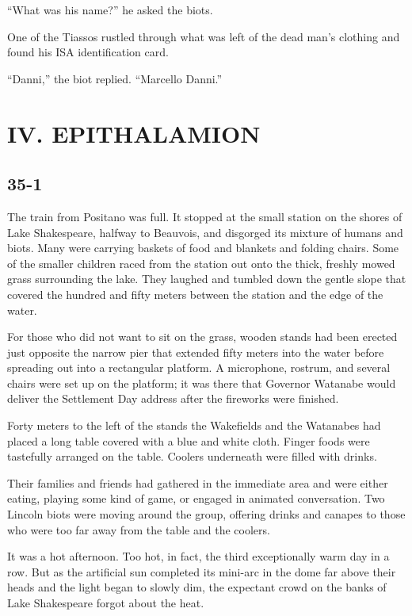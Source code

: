 \documentclass[]{article}
\begin{document}
{“What was his name?” he asked the biots.

One of the Tiassos rustled through what was left of the dead man’s clothing and found his ISA identification card.

“Danni,” the biot replied. “Marcello Danni.”


\section{IV. EPITHALAMION}



\subsection{35-1}

The train from Positano was full. It stopped at the small station on the shores of Lake Shakespeare, halfway to Beauvois, and disgorged its mixture of humans and biots. Many were carrying baskets of food and blankets and folding chairs. Some of the smaller children raced from the station out onto the thick, freshly mowed grass surrounding the lake. They laughed and tumbled down the gentle slope that covered the hundred and fifty meters between the station and the edge of the water.

For those who did not want to sit on the grass, wooden stands had been erected just opposite the narrow pier that extended fifty meters into the water before spreading out into a rectangular platform. A microphone, rostrum, and several chairs were set up on the platform; it was there that Governor Watanabe would deliver the Settlement Day address after the fireworks were finished.

Forty meters to the left of the stands the Wakefields and the Watanabes had placed a long table covered with a blue and white cloth. Finger foods were tastefully arranged on the table. Coolers underneath were filled with drinks.

Their families and friends had gathered in the immediate area and were either eating, playing some kind of game, or engaged in animated conversation. Two Lincoln biots were moving around the group, offering drinks and canapes to those who were too far away from the table and the coolers.

It was a hot afternoon. Too hot, in fact, the third exceptionally warm day in a row. But as the artificial sun completed its mini-arc in the dome far above their heads and the light began to slowly dim, the expectant crowd on the banks of Lake Shakespeare forgot about the heat.

}
\end{document}
